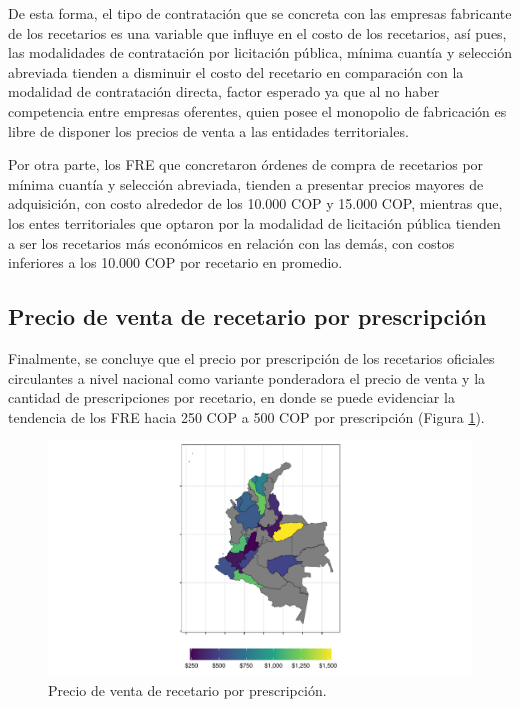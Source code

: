 \documentclass[
]{book}
\begin{document}
De esta forma, el tipo de contratación que se concreta con las empresas fabricante de los recetarios es una variable que influye en el costo de los recetarios, así pues, las modalidades de contratación por licitación pública, mínima cuantía y selección abreviada tienden a disminuir el costo del recetario en comparación con la modalidad de contratación directa, factor esperado ya que al no haber competencia entre empresas oferentes, quien posee el monopolio de fabricación es libre de disponer los precios de venta a las entidades territoriales.

Por otra parte, los FRE que concretaron órdenes de compra de recetarios por mínima cuantía y selección abreviada, tienden a presentar precios mayores de adquisición, con costo alrededor de los 10.000 COP y 15.000 COP, mientras que, los entes territoriales que optaron por la modalidad de licitación pública tienden a ser los recetarios más económicos en relación con las demás, con costos inferiores a los 10.000 COP por recetario en promedio.

\hypertarget{precio-de-venta-de-recetario-por-prescripciuxf3n}{%
\subsection{Precio de venta de recetario por prescripción}\label{precio-de-venta-de-recetario-por-prescripciuxf3n}}

Finalmente, se concluye que el precio por prescripción de los recetarios oficiales circulantes a nivel nacional como variante ponderadora el precio de venta y la cantidad de prescripciones por recetario, en donde se puede evidenciar la tendencia de los FRE hacia 250 COP a 500 COP por prescripción (Figura \ref{fig:PVTA-Recetarios}).

\begin{figure}

{\centering \includegraphics[width=0.9\linewidth]{InformeFinal_files/figure-latex/PVTA-Recetarios-1} 

}

\caption{Precio de venta de recetario por prescripción.}\label{fig:PVTA-Recetarios}
\end{figure}
\end{document}
